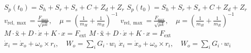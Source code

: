 \documentclass[12pt]{article}
\begin{document}
\color[HTML]{1E2761}
$\displaystyle S_p(t_0) = S_h + S_r + S_s + C + Z_d + Z_r$
\newpage
\color[HTML]{FFFFFF}
$\displaystyle S_p(t_0) = S_h + S_r + S_s + C + Z_d + Z_r$
\newpage
\color[HTML]{1E2761}
$\displaystyle v_{\mathrm{rel},\max} = \frac{F_{\max}}{\sqrt{\mu k}}, \quad \mu = \left(\frac{1}{m_H} + \frac{1}{m_R}\right)^{-1}$
\newpage
\color[HTML]{FFFFFF}
$\displaystyle v_{\mathrm{rel},\max} = \frac{F_{\max}}{\sqrt{\mu k}}, \quad \mu = \left(\frac{1}{m_H} + \frac{1}{m_R}\right)^{-1}$
\newpage
\color[HTML]{1E2761}
$\displaystyle M\cdot ẍ + D\cdot \dot{x} + K\cdot x = F_{\mathrm{ext}}$
\newpage
\color[HTML]{FFFFFF}
$\displaystyle M\cdot ẍ + D\cdot \dot{x} + K\cdot x = F_{\mathrm{ext}}$
\newpage
\color[HTML]{1E2761}
$\displaystyle \dot{x}_i = \dot{x}_o + \omega_o \times r_i, \quad W_o = \sum_i G_i\cdot w_i$
\newpage
\color[HTML]{FFFFFF}
$\displaystyle \dot{x}_i = \dot{x}_o + \omega_o \times r_i, \quad W_o = \sum_i G_i\cdot w_i$
\newpage
\end{document}

